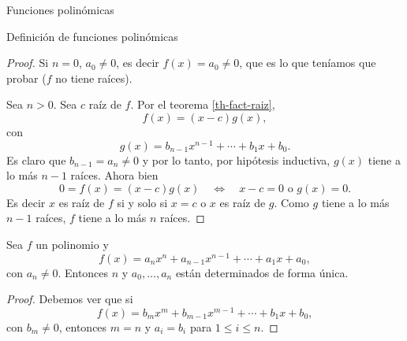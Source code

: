 \begin{chapter}{Funciones polin\'omicas}
\begin{section}{Definici\'on de funciones polin\'omicas}
\begin{proof}
            Si $n=0$, $a_0 \ne 0$, es decir  $f(x)=a_0\ne 0$, que es lo que teníamos que probar ($f$ no tiene raíces). 
            
            
            Sea $n>0$. Sea $c$ raíz de $f$. Por  el teorema \ref{th-fact-raiz},  
            \begin{equation*}
            f(x) = (x-c)g(x),
            \end{equation*}
            con 
            \begin{equation*}
            g(x) = b_{n-1}x^{n-1} + \cdots + b_1x +b_0.
            \end{equation*}
            Es claro que $b_{n-1} = a_n \ne 0$ y por lo tanto, por hipótesis inductiva, $g(x)$ tiene a lo más $n-1$ raíces. Ahora bien 
            \begin{equation*}
                0 =f(x) = (x-c)g(x) \quad \Leftrightarrow \quad x-c=0 \text{ o } g(x) =0.
            \end{equation*} 
            Es decir $x$ es raíz de $f$ si y solo si $x=c$ o $x$ es raíz de $g$. Como $g$ tiene a lo más $n-1$ raíces,  $f$ tiene a lo más $n$ raíces.
        \end{proof}
                            
        \begin{corolario}
            Sea $f$ un polinomio y 
            \begin{equation*}
                f(x) = a_nx^n + a_{n-1}x^{n-1}+\cdots + a_1x +a_0,
            \end{equation*}
            con $a_n \ne 0$.  Entonces $n$ y $a_0,\ldots,a_n$ están determinados de forma única.
        \end{corolario}
        \begin{proof}
            Debemos ver que si 
            \begin{equation*}
            f(x) = b_mx^m + b_{m-1}x^{m-1}+\cdots + b_1x +b_0,
            \end{equation*}
            con $b_m \ne 0$, entonces $m=n$ y $a_i=b_i$ para $1 \le i \le n$. 
            

\end{proof}
\end{section}
\end{chapter}
